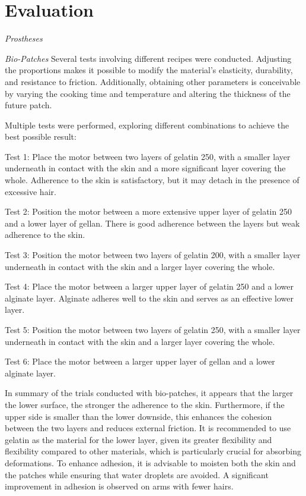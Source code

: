 \section{Evaluation}


\textit{Prostheses}

\textit{Bio-Patches}
Several tests involving different recipes were conducted. Adjusting the proportions makes it possible to modify the material's elasticity, durability, and resistance to friction. Additionally, obtaining other parameters is conceivable by varying the cooking time and temperature and altering the thickness of the future patch.

Multiple tests were performed, exploring different combinations to achieve the best possible result:

\item Test 1: Place the motor between two layers of gelatin 250, with a smaller layer underneath in contact with the skin and a more significant layer covering the whole. Adherence to the skin is satisfactory, but it may detach in the presence of excessive hair.
\item Test 2: Position the motor between a more extensive upper layer of gelatin 250 and a lower layer of gellan. There is good adherence between the layers but weak adherence to the skin.
\item Test 3: Position the motor between two layers of gelatin 200, with a smaller layer underneath in contact with the skin and a larger layer covering the whole.
\item Test 4: Place the motor between a larger upper layer of gelatin 250 and a lower alginate layer. Alginate adheres well to the skin and serves as an effective lower layer.
\item Test 5: Position the motor between two layers of gelatin 250, with a smaller layer underneath in contact with the skin and a larger layer covering the whole.
\item Test 6: Place the motor between a larger upper layer of gellan and a lower alginate layer.

In summary of the trials conducted with bio-patches, it appears that the larger the lower surface, the stronger the adherence to the skin. Furthermore, if the upper side is smaller than the lower downside, this enhances the cohesion between the two layers and reduces external friction. It is recommended to use gelatin as the material for the lower layer, given its greater flexibility and flexibility compared to other materials, which is particularly crucial for absorbing deformations. To enhance adhesion, it is advisable to moisten both the skin and the patches while ensuring that water droplets are avoided. A significant improvement in adhesion is observed on arms with fewer hairs.

